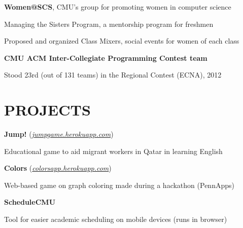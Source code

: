 \documentclass[margin, 11pt]{res} %
\begin{document}
\begin{resume}
\vspace{3pt}

{\bf Women@SCS}, CMU's group for promoting women in computer science

\begin{itemize} \itemsep -2pt
{\small \item Managing the Sisters Program, a mentorship program for freshmen
\item Proposed and organized Class Mixers, social events for women of each class}
\end{itemize}

\vspace{3pt}

{\bf CMU ACM Inter-Collegiate Programming Contest team}
\begin{itemize} \itemsep -2pt
{\small \item Stood 23rd (out of 131 teams) in the Regional Contest (ECNA), 2012}
\end{itemize}

\section{PROJECTS} 

{\bf Jump!} (\href{http://jumpgame.herokuapp.com/}{\sl jumpgame.herokuapp.com})

\begin{itemize} \itemsep -2pt
{\small \item Educational game to aid migrant workers in Qatar in learning English}
\end{itemize}

\vspace{3pt}

{\bf Colors} (\href{http://colorsapp.herokuapp.com}{\sl colorsapp.herokuapp.com})
\begin{itemize} \itemsep -2pt
{\small \item Web-based game on graph coloring made during a hackathon (PennApps)}
\end{itemize}

\vspace{3pt}

{\bf ScheduleCMU} 
\begin{itemize} \itemsep -2pt
{\small \item Tool for easier academic scheduling on mobile devices (runs in browser)}
\end{itemize}


\end{resume}
\end{document}
